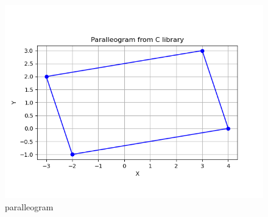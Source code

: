 \documentclass[journal]{IEEEtran}
\theoremstyle{remark}
\begin{document}
\begin{figure}[H]
    \centering
    \includegraphics[width=0.9\columnwidth]{figs/parallelogram.png}
    \caption{paralleogram}
    \label{fig:placeholder_1}
\end{figure}
\end{document}
